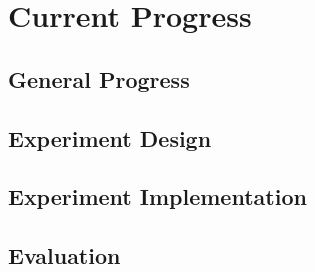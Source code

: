\chapter{Current Progress}

\section{General Progress}

\section{Experiment Design}

\section{Experiment Implementation}

\section{Evaluation}
